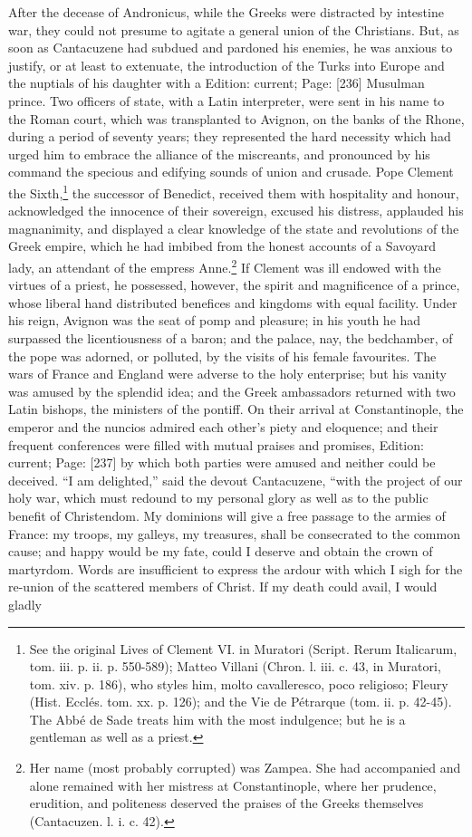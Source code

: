 After the decease of Andronicus, while the Greeks were distracted by intestine war, they could not presume to agitate a general union of the Christians. But, as soon as Cantacuzene had subdued and pardoned his enemies, he was anxious to justify, or at least to extenuate, the introduction of the Turks into Europe and the nuptials of his daughter with a Edition: current; Page: [236] Musulman prince. Two officers of state, with a Latin interpreter, were sent in his name to the Roman court, which was transplanted to Avignon, on the banks of the Rhone, during a period of seventy years; they represented the hard necessity which had urged him to embrace the alliance of the miscreants, and pronounced by his command the specious and edifying sounds of union and crusade. Pope Clement the Sixth,\footnote{See the original Lives of Clement VI. in Muratori (Script. Rerum Italicarum, tom. iii. p. ii. p. 550-589); Matteo Villani (Chron. l. iii. c. 43, in Muratori, tom. xiv. p. 186), who styles him, molto cavalleresco, poco religioso; Fleury (Hist. Ecclés. tom. xx. p. 126); and the Vie de Pétrarque (tom. ii. p. 42-45). The Abbé de Sade treats him with the most indulgence; but he is a gentleman as well as a priest.} the successor of Benedict, received them with hospitality and honour, acknowledged the innocence of their sovereign, excused his distress, applauded his magnanimity, and displayed a clear knowledge of the state and revolutions of the Greek empire, which he had imbibed from the honest accounts of a Savoyard lady, an attendant of the empress Anne.\footnote{Her name (most probably corrupted) was Zampea. She had accompanied and alone remained with her mistress at Constantinople, where her prudence, erudition, and politeness deserved the praises of the Greeks themselves (Cantacuzen. l. i. c. 42).} If Clement was ill endowed with the virtues of a priest, he possessed, however, the spirit and magnificence of a prince, whose liberal hand distributed benefices and kingdoms with equal facility. Under his reign, Avignon was the seat of pomp and pleasure; in his youth he had surpassed the licentiousness of a baron; and the palace, nay, the bedchamber, of the pope was adorned, or polluted, by the visits of his female favourites. The wars of France and England were adverse to the holy enterprise; but his vanity was amused by the splendid idea; and the Greek ambassadors returned with two Latin bishops, the ministers of the pontiff. On their arrival at Constantinople, the emperor and the nuncios admired each other\texthebrew{}’s piety and eloquence; and their frequent conferences were filled with mutual praises and promises, Edition: current; Page: [237] by which both parties were amused and neither could be deceived. \texthebrew{“}I am delighted,\texthebrew{}” said the devout Cantacuzene, \texthebrew{“}with the project of our holy war, which must redound to my personal glory as well as to the public benefit of Christendom. My dominions will give a free passage to the armies of France: my troops, my galleys, my treasures, shall be consecrated to the common cause; and happy would be my fate, could I deserve and obtain the crown of martyrdom. Words are insufficient to express the ardour with which I sigh for the re-union of the scattered members of Christ. If my death could avail, I would gladly 